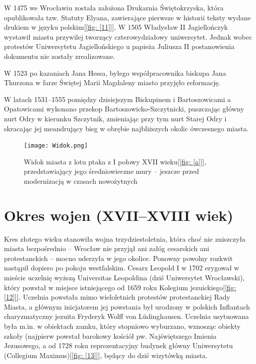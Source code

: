 \documentclass{article}
\begin{document}
W 1475 we Wrocławiu została założona Drukarnia Świętokrzyska, która opublikowała tzw. Statuty Elyana, zawierające pierwsze w historii teksty wydane drukiem w języku polskim[\ref{fig: [11]}].
W 1505 Władysław II Jagiellończyk wystawił miastu przywilej tworzący czterowydziałowy uniwersytet. Jednak wobec protestów Uniwersytetu Jagiellońskiego u papieża Juliusza II postanowienia dokumentu nie zostały zrealizowane.

W 1523 po kazaniach Jana Hessa, byłego współpracownika biskupa Jana Thurzona w farze Świętej Marii Magdaleny miasto przyjęło reformację.

W latach 1531–1555 pomiędzy dzisiejszym Biskupinem i Bartoszowicami a Opatowicami wykonano przekop Bartoszowicko-Szczytnicki, puszczając główny nurt Odry w kierunku Szczytnik, zmieniając przy tym nurt Starej Odry i skracając jej meandrujący bieg w obrębie najbliższych okolic ówczesnego miasta.

\begin{center}
\begin{figure}[h]
	\centering
	\texttt{[image: Widok.png]}
	\caption{Widok miasta z lotu ptaka z I połowy XVII wieku[\ref{fig: [a]}], przedstawiający jego średniowieczne mury – jeszcze przed modernizacją w czasach nowożytnych}
	\label{fig: I połowa XVII W.}
\end{figure}
\end{center}
\section {Okres wojen (XVII–XVIII wiek)}

Kres złotego wieku stanowiła wojna trzydziestoletnia, która choć nie zniszczyła miasta bezpośrednio – Wrocław nie przyjął ani załóg cesarskich ani protestanckich – mocno uderzyła w jego okolice. Ponowny powolny rozkwit nastąpił dopiero po pokoju westfalskim. Cesarz Leopold I w 1702 erygował w mieście uczelnię wyższą Universitas Leopoldina (dziś Uniwersytet Wrocławski), który powstał w miejsce istniejącego od 1659 roku Kolegium jezuickiego[\ref{fig: [12]}]. Uczelnia powstała mimo wieloletnich protestów protestanckiej Rady Miasta, a głównym inicjatorem jej powstania był urodzony w polskich Inflantach charyzmatyczny jezuita Fryderyk Wolff von Lüdinghausen. Uczelnia usytuowana była m.in. w obiektach zamku, który stopniowo wyburzano, wznosząc obiekty szkoły (najpierw powstał barokowy kościół pw. Najświętszego Imienia Jezusowego, a od 1728 roku reprezentacyjny budynek główny Uniwersytetu (Collegium Maximus)[\ref{fig: [13]}], będący do dziś wizytówką miasta.
\end{document}
